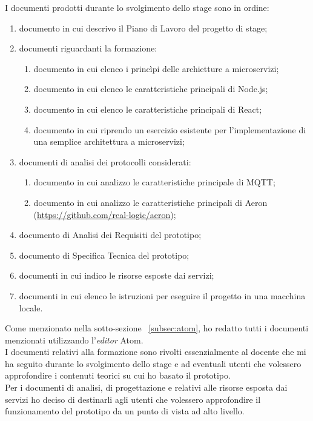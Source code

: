I documenti prodotti durante lo svolgimento dello stage sono in ordine:
\begin{enumerate}
	\item documento in cui descrivo il Piano di Lavoro del progetto di stage;
	\item documenti riguardanti la formazione:
		\begin{enumerate}
			\item documento in cui elenco i princìpi delle archietture a microservizi;
			\item documento in cui elenco le caratteristiche principali di Node.js;
			\item documento in cui elenco le caratteristiche principali di React;
			\item documento in cui riprendo un esercizio esistente per l'implementazione di una semplice architettura a microservizi;
		\end{enumerate}
		\item documenti di analisi dei protocolli considerati:
		\begin{enumerate}
			\item documento in cui analizzo le caratteristiche principale di MQTT;
			\item documento in cui analizzo le caratteristiche principali di Aeron (\url{https://github.com/real-logic/aeron});
		\end{enumerate}
		\item documento di Analisi dei Requisiti del prototipo;
		\item documento di Specifica Tecnica del prototipo;
		\item documenti in cui indico le risorse esposte dai servizi;
		\item documenti in cui elenco le istruzioni per eseguire il progetto in una macchina locale.
\end{enumerate}
Come menzionato nella sotto-sezione ~\ref{subsec:atom}, ho redatto tutti i documenti menzionati utilizzando l'\emph{editor} Atom.\\
I documenti relativi alla formazione sono rivolti essenzialmente al docente che mi ha seguito durante lo svolgimento dello stage e ad eventuali utenti che volessero approfondire i contenuti teorici su cui ho basato il prototipo.\\
Per i documenti di analisi, di progettazione e relativi alle risorse esposta dai servizi ho deciso di destinarli agli utenti che volessero approfondire il funzionamento del prototipo da un punto di vista ad alto livello.\\
